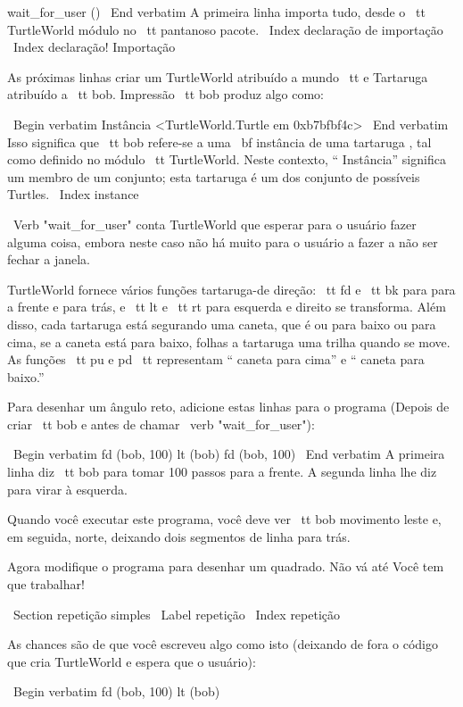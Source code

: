 \documentclass[10pt]{book}
\begin{document}
{wait_for_user ()
\ End {verbatim}
%
A primeira linha importa tudo, desde o {\ tt TurtleWorld} módulo
no {\ tt pantanoso} pacote.
\ Index {declaração de importação}
\ Index {declaração! Importação}

As próximas linhas criar um TurtleWorld atribuído a {mundo \ tt} e
Tartaruga atribuído a {\ tt bob}. Impressão {\ tt bob} produz algo
como:

\ Begin {verbatim}
Instância <TurtleWorld.Turtle em 0xb7bfbf4c>
\ End {verbatim}
%
Isso significa que {\ tt bob} refere-se a
uma {\ bf instância} de uma tartaruga
, tal como definido no módulo {\ tt TurtleWorld}. Neste contexto,
`` Instância'' significa um membro de um conjunto;
esta tartaruga é um dos conjunto de possíveis Turtles.
\ Index {instance}

\ Verb "wait_for_user" conta TurtleWorld que esperar para o usuário
fazer alguma coisa, embora neste caso não há muito para
o usuário a fazer a não ser fechar a janela.

TurtleWorld fornece vários
funções tartaruga-de direção: {\ tt fd} e {\ tt bk} para
para a frente e para trás, e {\ tt lt} e {\ tt rt} para esquerda e
direito se transforma. Além disso, cada tartaruga está segurando uma caneta, que é
ou para baixo ou para cima, se a caneta está para baixo, folhas a tartaruga
uma trilha quando se move. As funções {\ tt pu} e {pd \ tt}
representam `` caneta para cima'' e `` caneta para baixo.''

Para desenhar um ângulo reto, adicione estas linhas para o programa
(Depois de criar {\ tt bob} e antes de chamar \ verb "wait_for_user"):

\ Begin {verbatim}
fd (bob, 100)
lt (bob)
fd (bob, 100)
\ End {verbatim}
%
A primeira linha diz {\ tt bob} para tomar 100 passos
para a frente. A segunda linha lhe diz para virar à esquerda.

Quando você executar este programa, você deve ver {\ tt bob} movimento leste e, em seguida,
norte, deixando dois segmentos de linha para trás.

Agora modifique o programa para desenhar um quadrado. Não vá até
Você tem que trabalhar!


\ Section {repetição simples}
\ Label {repetição}
\ Index {repetição}

As chances são de que você escreveu algo como isto (deixando de fora o código
que cria TurtleWorld e espera que o usuário):

\ Begin {verbatim}
fd (bob, 100)
lt (bob)

}
\end{document}
